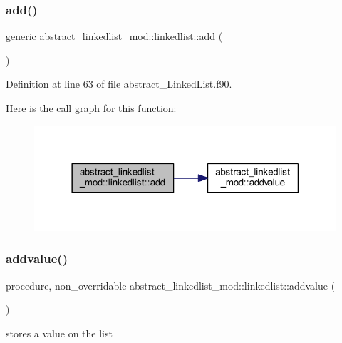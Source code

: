 \subsubsection{\texorpdfstring{add()}{add()}}
{\footnotesize\ttfamily generic abstract\+\_\+linkedlist\+\_\+mod\+::linkedlist\+::add (\begin{DoxyParamCaption}{ }\end{DoxyParamCaption})\hspace{0.3cm}{\ttfamily [private]}}



Definition at line 63 of file abstract\+\_\+\+Linked\+List.\+f90.

Here is the call graph for this function\+:
\nopagebreak
\begin{figure}[H]
\begin{center}
\leavevmode
\includegraphics[width=318pt]{structabstract__linkedlist__mod_1_1linkedlist_a4962955d0f6e8fc46cccaa41e5f32b67_cgraph}
\end{center}
\end{figure}
\mbox{\label{structabstract__linkedlist__mod_1_1linkedlist_a4b70f9966ccea6a96228341fb0e0eaf5}} 
\subsubsection{\texorpdfstring{addvalue()}{addvalue()}}
{\footnotesize\ttfamily procedure, non\+\_\+overridable abstract\+\_\+linkedlist\+\_\+mod\+::linkedlist\+::addvalue (\begin{DoxyParamCaption}{ }\end{DoxyParamCaption})\hspace{0.3cm}{\ttfamily [private]}}



stores a value on the list 



